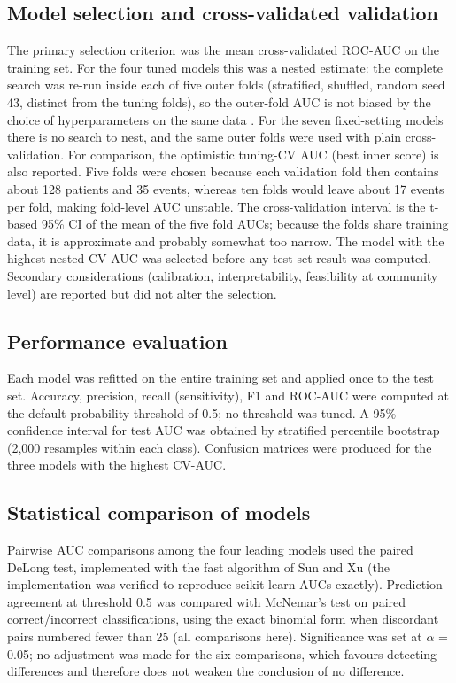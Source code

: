 \documentclass[a4paper,fleqn]{cas-dc}
\begin{document}
\subsection{Model selection and cross-validated validation}
\label{sec:sel}

The primary selection criterion was the mean cross-validated ROC-AUC on the training set. For the four tuned models this was a nested estimate: the complete search was re-run inside each of five outer folds (stratified, shuffled, random seed 43, distinct from the tuning folds), so the outer-fold AUC is not biased by the choice of hyperparameters on the same data \cite{r22}. For the seven fixed-setting models there is no search to nest, and the same outer folds were used with plain cross-validation. For comparison, the optimistic tuning-CV AUC (best inner score) is also reported. Five folds were chosen because each validation fold then contains about 128 patients and 35 events, whereas ten folds would leave about 17 events per fold, making fold-level AUC unstable. The cross-validation interval is the t-based 95\% CI of the mean of the five fold AUCs; because the folds share training data, it is approximate and probably somewhat too narrow. The model with the highest nested CV-AUC was selected before any test-set result was computed. Secondary considerations (calibration, interpretability, feasibility at community level) are reported but did not alter the selection.

\subsection{Performance evaluation}
\label{sec:perf}

Each model was refitted on the entire training set and applied once to the test set. Accuracy, precision, recall (sensitivity), F1 and ROC-AUC were computed at the default probability threshold of 0.5; no threshold was tuned. A 95\% confidence interval for test AUC was obtained by stratified percentile bootstrap (2,000 resamples within each class). Confusion matrices were produced for the three models with the highest CV-AUC.

\subsection{Statistical comparison of models}
\label{sec:stat}

Pairwise AUC comparisons among the four leading models used the paired DeLong test, implemented with the fast algorithm of Sun and Xu \cite{r26} (the implementation was verified to reproduce scikit-learn AUCs exactly). Prediction agreement at threshold 0.5 was compared with McNemar’s test \cite{r33} on paired correct/incorrect classifications, using the exact binomial form when discordant pairs numbered fewer than 25 (all comparisons here). Significance was set at $\alpha$ = 0.05; no adjustment was made for the six comparisons, which favours detecting differences and therefore does not weaken the conclusion of no difference.
\end{document}
